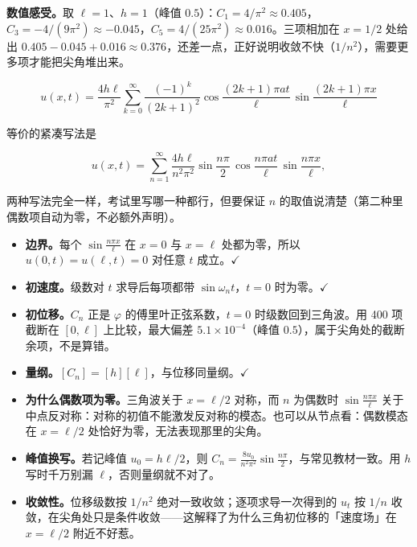 \textbf{数值感受。}取 $\ell=1$、$h=1$（峰值 $0.5$）：$C_1=4/\pi^2\approx0.405$，$C_3=-4/(9\pi^2)\approx-0.045$，$C_5=4/(25\pi^2)\approx0.016$。三项相加在 $x=1/2$ 处给出 $0.405-0.045+0.016\approx0.376$，还差一点，正好说明收敛不快（$1/n^2$），需要更多项才能把尖角堆出来。


\[
\boxed{\;
u(x,t)=\frac{4h\ell}{\pi^2}\sum_{k=0}^{\infty}\frac{(-1)^k}{(2k+1)^2}
\cos\frac{(2k+1)\pi at}{\ell}\,
\sin\frac{(2k+1)\pi x}{\ell}
\;}
\]

等价的紧凑写法是

\[
u(x,t)=\sum_{n=1}^{\infty}\frac{4h\ell}{n^2\pi^2}\sin\frac{n\pi}{2}\,
\cos\frac{n\pi at}{\ell}\,\sin\frac{n\pi x}{\ell},
\]

两种写法完全一样，考试里写哪一种都行，但要保证 $n$ 的取值说清楚（第二种里偶数项自动为零，不必额外声明）。


\begin{itemize}
  \item \textbf{边界。}每个 $\sin\frac{n\pi x}{\ell}$ 在 $x=0$ 与 $x=\ell$ 处都为零，所以 $u(0,t)=u(\ell,t)=0$ 对任意 $t$ 成立。$\checkmark$
  \item \textbf{初速度。}级数对 $t$ 求导后每项都带 $\sin\omega_nt$，$t=0$ 时为零。$\checkmark$
  \item \textbf{初位移。}$C_n$ 正是 $\varphi$ 的傅里叶正弦系数，$t=0$ 时级数回到三角波。用 400 项截断在 $[0,\ell]$ 上比较，最大偏差 $5.1\times10^{-4}$（峰值 $0.5$），属于尖角处的截断余项，不是算错。
  \item \textbf{量纲。}$[C_n]=[h][\ell]$，与位移同量纲。$\checkmark$
  \item \textbf{为什么偶数项为零。}三角波关于 $x=\ell/2$ 对称，而 $n$ 为偶数时 $\sin\frac{n\pi x}{\ell}$ 关于中点反对称：对称的初值不能激发反对称的模态。也可以从节点看：偶数模态在 $x=\ell/2$ 处恰好为零，无法表现那里的尖角。
  \item \textbf{峰值换写。}若记峰值 $u_0=h\ell/2$，则 $C_n=\frac{8u_0}{n^2\pi^2}\sin\frac{n\pi}{2}$，与常见教材一致。用 $h$ 写时千万别漏 $\ell$，否则量纲就不对了。
  \item \textbf{收敛性。}位移级数按 $1/n^2$ 绝对一致收敛；逐项求导一次得到的 $u_t$ 按 $1/n$ 收敛，在尖角处只是条件收敛——这解释了为什么三角初位移的「速度场」在 $x=\ell/2$ 附近不好惹。
\end{itemize}


